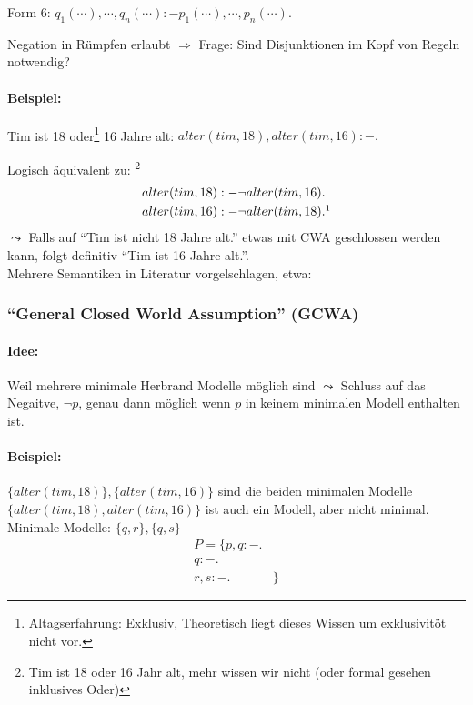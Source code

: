 \documentclass[12pt, a4paper]{article}
\begin{document}
Form 6: $q_1(\cdots), \cdots, q_n(\cdots) :- p_1(\cdots), \cdots, p_n(\cdots).$

Negation in Rümpfen erlaubt $\Rightarrow$ Frage: Sind Disjunktionen im Kopf von Regeln notwendig? \\

\paragraph{Beispiel:}  
Tim ist 18 oder\footnote{Altagserfahrung: Exklusiv, Theoretisch liegt dieses Wissen um exklusivitöt nicht vor.} 16 Jahre alt: $alter(tim, 18), alter(tim, 16) :- .$

Logisch äquivalent zu: \footnote{Tim ist 18 oder 16 Jahr alt, mehr wissen wir nicht (oder formal gesehen inklusives Oder)}
\begin{align*}
&alter(tim, 18) :- \lnot alter(tim, 16). \\
&alter(tim, 16) :- \lnot alter(tim, 18). \footnotemark
\end{align*}
$\leadsto$ Falls auf ``Tim ist nicht 18 Jahre alt.'' etwas mit CWA geschlossen werden kann, folgt definitiv ``Tim ist 16 Jahre alt.''.\\
Mehrere Semantiken in Literatur vorgelschlagen, etwa:

\subsubsection*{``General Closed World Assumption'' (GCWA)}
\paragraph{Idee:}
Weil mehrere minimale Herbrand Modelle möglich sind $\leadsto$ Schluss auf das Negaitve, $\lnot p$, genau dann möglich wenn $p$ in keinem minimalen Modell enthalten ist.

\paragraph{Beispiel:} $\{ alter(tim, 18) \}, \{ alter(tim, 16) \}$ sind die beiden minimalen Modelle \\
$\{ alter(tim, 18), alter(tim, 16) \}$ ist auch ein Modell, aber nicht minimal. \\

Minimale Modelle: $\{ q,r \}, \{q,s \}$
\begin{align*}
P = \{ p,q :-.& \\
q :- . & \\
r,s :-.& \}
\end{align*}
\end{document}
